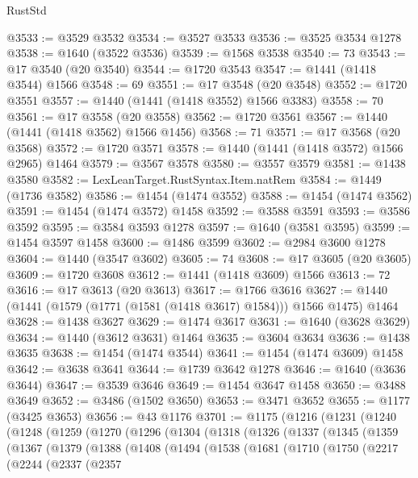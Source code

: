 \begin{lexlean}{RustStd}
\begin{coremodule}
@3533 := @3529 @3532
@3534 := @3527 @3533
@3536 := @3525 @3534 @1278
@3538 := @1640 (@3522 @3536)
@3539 := @1568 @3538
@3540 := 73
@3543 := @17 @3540 (@20 @3540)
@3544 := @1720 @3543
@3547 := @1441 (@1418 @3544) @1566
@3548 := 69
@3551 := @17 @3548 (@20 @3548)
@3552 := @1720 @3551
@3557 := @1440 (@1441 (@1418 @3552) @1566 @3383)
@3558 := 70
@3561 := @17 @3558 (@20 @3558)
@3562 := @1720 @3561
@3567 := @1440 (@1441 (@1418 @3562) @1566 @1456)
@3568 := 71
@3571 := @17 @3568 (@20 @3568)
@3572 := @1720 @3571
@3578 := @1440 (@1441 (@1418 @3572) @1566 @2965) @1464
@3579 := @3567 @3578
@3580 := @3557 @3579
@3581 := @1438 @3580
@3582 := LexLeanTarget.RustSyntax.Item.natRem
@3584 := @1449 (@1736 @3582)
@3586 := @1454 (@1474 @3552)
@3588 := @1454 (@1474 @3562)
@3591 := @1454 (@1474 @3572) @1458
@3592 := @3588 @3591
@3593 := @3586 @3592
@3595 := @3584 @3593 @1278
@3597 := @1640 (@3581 @3595)
@3599 := @1454 @3597 @1458
@3600 := @1486 @3599
@3602 := @2984 @3600 @1278
@3604 := @1440 (@3547 @3602)
@3605 := 74
@3608 := @17 @3605 (@20 @3605)
@3609 := @1720 @3608
@3612 := @1441 (@1418 @3609) @1566
@3613 := 72
@3616 := @17 @3613 (@20 @3613)
@3617 := @1766 @3616
@3627 := @1440 (@1441 (@1579 (@1771 (@1581 (@1418 @3617) @1584))) @1566 @1475) @1464
@3628 := @1438 @3627
@3629 := @1474 @3617
@3631 := @1640 (@3628 @3629)
@3634 := @1440 (@3612 @3631) @1464
@3635 := @3604 @3634
@3636 := @1438 @3635
@3638 := @1454 (@1474 @3544)
@3641 := @1454 (@1474 @3609) @1458
@3642 := @3638 @3641
@3644 := @1739 @3642 @1278
@3646 := @1640 (@3636 @3644)
@3647 := @3539 @3646
@3649 := @1454 @3647 @1458
@3650 := @3488 @3649
@3652 := @3486 (@1502 @3650)
@3653 := @3471 @3652
@3655 := @1177 (@3425 @3653)
@3656 := @43 @1176
@3701 := @1175
    (@1216
      (@1231
        (@1240
          (@1248
            (@1259
              (@1270
                (@1296
                  (@1304
                    (@1318
                      (@1326
                        (@1337
                          (@1345
                            (@1359
                              (@1367
                                (@1379
                                  (@1388
                                    (@1408
                                      (@1494
                                        (@1538
                                          (@1681
                                            (@1710
                                              (@1750
                                                (@2217
                                                  (@2244
                                                    (@2337
                                                      (@2357

\end{coremodule}
\end{lexlean}
